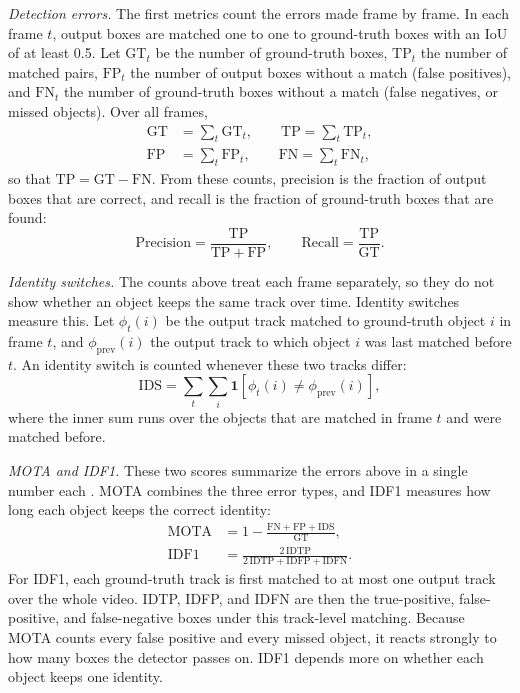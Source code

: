 \emph{Detection errors.} The first metrics count the errors made frame by frame. In each frame $t$, output boxes are matched one to one to ground-truth boxes with an IoU of at least 0.5. Let $\mathrm{GT}_t$ be the number of ground-truth boxes, $\mathrm{TP}_t$ the number of matched pairs, $\mathrm{FP}_t$ the number of output boxes without a match (false positives), and $\mathrm{FN}_t$ the number of ground-truth boxes without a match (false negatives, or missed objects). Over all frames,
\begin{align}
\mathrm{GT}&=\sum_t \mathrm{GT}_t,\qquad \mathrm{TP}=\sum_t \mathrm{TP}_t,\label{eq:res-gt}\\
\mathrm{FP}&=\sum_t \mathrm{FP}_t,\qquad \mathrm{FN}=\sum_t \mathrm{FN}_t,\label{eq:res-fpfn}
\end{align}
so that $\mathrm{TP}=\mathrm{GT}-\mathrm{FN}$. From these counts, precision is the fraction of output boxes that are correct, and recall is the fraction of ground-truth boxes that are found:
\begin{equation}
\mathrm{Precision}=\frac{\mathrm{TP}}{\mathrm{TP}+\mathrm{FP}},\qquad
\mathrm{Recall}=\frac{\mathrm{TP}}{\mathrm{GT}}.
\label{eq:res-prrc}
\end{equation}

\emph{Identity switches.} The counts above treat each frame separately, so they do not show whether an object keeps the same track over time. Identity switches measure this. Let $\phi_t(i)$ be the output track matched to ground-truth object $i$ in frame $t$, and $\phi_{\mathrm{prev}}(i)$ the output track to which object $i$ was last matched before $t$. An identity switch is counted whenever these two tracks differ:
\begin{equation}
\mathrm{IDS}=\sum_t\sum_{i}\mathbf{1}\!\left[\phi_t(i)\neq\phi_{\mathrm{prev}}(i)\right],
\label{eq:res-ids}
\end{equation}
where the inner sum runs over the objects that are matched in frame $t$ and were matched before.

\emph{MOTA and IDF1.} These two scores summarize the errors above in a single number each \cite{bernardin2008clear,ristani2016idf1}. MOTA combines the three error types, and IDF1 measures how long each object keeps the correct identity:
\begin{align}
\mathrm{MOTA}&=1-\frac{\mathrm{FN}+\mathrm{FP}+\mathrm{IDS}}{\mathrm{GT}},\label{eq:res-mota}\\
\mathrm{IDF1}&=\frac{2\,\mathrm{IDTP}}{2\,\mathrm{IDTP}+\mathrm{IDFP}+\mathrm{IDFN}}.\label{eq:res-idf1}
\end{align}
For IDF1, each ground-truth track is first matched to at most one output track over the whole video. IDTP, IDFP, and IDFN are then the true-positive, false-positive, and false-negative boxes under this track-level matching. Because MOTA counts every false positive and every missed object, it reacts strongly to how many boxes the detector passes on. IDF1 depends more on whether each object keeps one identity.

